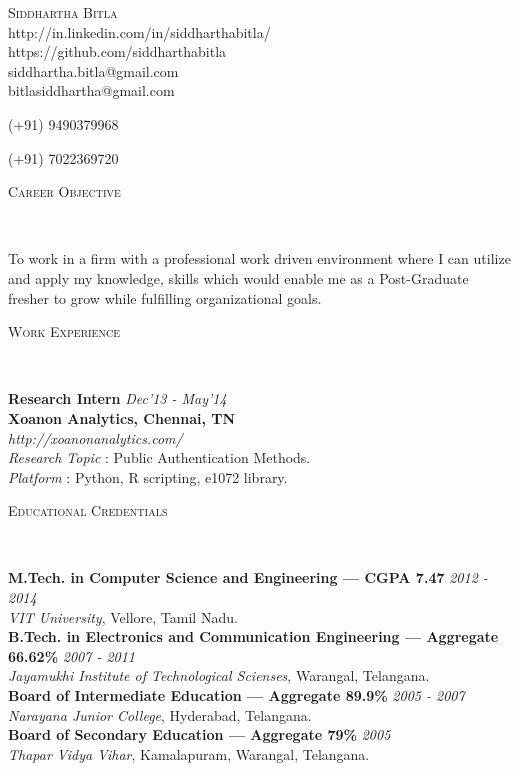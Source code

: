 \documentclass[9pt]{article}
\newenvironment{changemargin}[2]{%
  \begin{list}{}{%
    \setlength{\topsep}{0pt}%
    \setlength{\leftmargin}{#1}%
    \setlength{\rightmargin}{#2}%
    \setlength{\listparindent}{\parindent}%
    \setlength{\itemindent}{\parindent}%
    \setlength{\parsep}{\parskip}%
  }%
  \item[]}{\end{list}
}
\newcommand{\lineover}{
	\begin{changemargin}{-0.05in}{-0.05in}
		\vspace*{-8pt}
		\hrulefill \\
		\vspace*{-2pt}
	\end{changemargin}
}
\newcommand{\header}[1]{
	\begin{changemargin}{-0.5in}{-0.5in}
		\scshape{#1}\\
  	\lineover
	\end{changemargin}
}
\newcommand{\contact}[4]{
	\begin{changemargin}{-0.5in}{-0.5in}
		\begin{center}
			{\Large \scshape {#1}}\\ \smallskip
			{#2}\\ \smallskip 
			{#3}\\ \smallskip
			{#4}\smallskip
		\end{center}
	\end{changemargin}
}
\newenvironment{body} {
	\vspace*{-16pt}
	\begin{changemargin}{-0.25in}{-0.5in}
  }	
	{\end{changemargin}
}
\begin{document}
\contact{Siddhartha Bitla}{http://in.linkedin.com/in/siddharthabitla/\\https://github.com/siddharthabitla}{siddhartha.bitla@gmail.com}{bitlasiddhartha@gmail.com}  \centerline{(+91) 9490379968} \centerline{(+91) 7022369720} 

\smallskip
\header{Career Objective}

\begin{body}
	\vspace{14pt}
	To work in a firm with a professional work driven environment where I can utilize and apply my knowledge, skills which would enable me as a Post-Graduate fresher to grow while fulfilling organizational goals.
\end{body}

\smallskip

\header{Work Experience}

\begin{body}
	\vspace{14pt}
	\textbf{Research Intern}{} \hfill \emph{Dec'13 - May'14} \\
	\textbf{Xoanon Analytics, Chennai, TN}{} \\
	\emph{http://xoanonanalytics.com/} \\
	\textit{Research Topic} : Public Authentication Methods. \\
	\textit{Platform} : Python, R scripting, e1072 library.\\
\end{body}

\smallskip

\header{Educational Credentials}

\begin{body}
	\vspace{14pt}
	\textbf{M.Tech. in Computer Science and Engineering --- CGPA 7.47}{} \hfill \emph{2012 - 2014}{} \\
	\emph{VIT University}, Vellore, Tamil Nadu{}. \\
  \medskip
	\textbf{B.Tech. in Electronics and Communication Engineering --- Aggregate 66.62\%} \hfill \emph{2007 - 2011} \\
	\emph{Jayamukhi Institute of Technological Scienses}, Warangal, Telangana{}.\\
	\medskip
	\textbf{Board of Intermediate Education --- Aggregate 89.9\%} \hfill \emph{2005 - 2007}{} \\
	\emph{Narayana Junior College}, Hyderabad, Telangana{}. \\
	\medskip
	\textbf{Board of Secondary Education --- Aggregate 79\%} \hfill \emph{2005}{} \\
	\emph{Thapar Vidya Vihar}, Kamalapuram, Warangal, Telangana{}. \\

\end{body}
\end{document}
